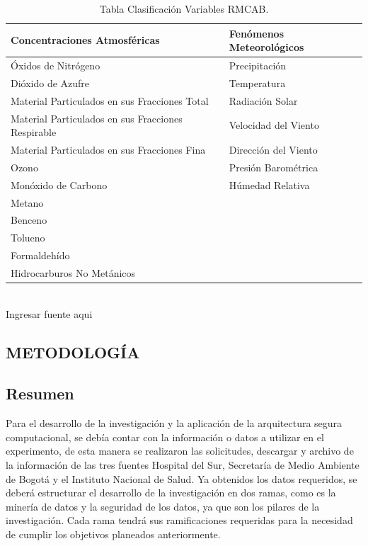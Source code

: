 \documentclass[a4paper,openright,12pt]{book}
\theoremstyle{definition}
\theoremstyle{remark}
\begin{document}
\begin{table}[htbp]
\begin{center}
\caption{Tabla Clasificación Variables RMCAB.}
\resizebox{10cm}{!} {
\begin{tabular}{|l|l|}
\hline
Concentraciones Atmosféricas & Fenómenos  Meteorológicos \\
\hline \hline
Óxidos de Nitrógeno & Precipitación \\ \hline
Dióxido de Azufre & Temperatura \\ \hline
Material Particulados en sus Fracciones Total & Radiación Solar \\ \hline
Material Particulados en sus Fracciones Respirable & Velocidad del Viento \\ \hline
Material Particulados en sus Fracciones Fina & Dirección del Viento \\ \hline
Ozono & Presión Barométrica \\ \hline
Monóxido de Carbono & Húmedad Relativa \\ \hline
Metano &  \\ \hline
Benceno &  \\ \hline
Tolueno &  \\ \hline
Formaldehído &  \\ \hline
Hidrocarburos No Metánicos & \\ \hline
\end{tabular}
}
\label{tabla:variables RMCAB}
\\Ingresar fuente aqui
\end{center}
\end{table}

\begin{center}
\chapter{METODOLOGÍA}\label{cap.metodologia}
\end{center}
\section{Resumen}
Para el desarrollo de la investigación y la aplicación de la arquitectura segura computacional, se debía contar con la información o datos a utilizar en el experimento, de esta manera se realizaron las solicitudes, descargar y archivo de la información de las tres fuentes Hospital del Sur, Secretaría de Medio Ambiente de Bogotá y el Instituto Nacional de Salud. Ya obtenidos los datos requeridos, se deberá estructurar el desarrollo de la investigación en dos ramas, como es la minería de datos y la seguridad de los datos, ya que son los pilares de la investigación. Cada rama tendrá sus ramificaciones requeridas para la necesidad de cumplir los objetivos planeados anteriormente.
\end{document}
